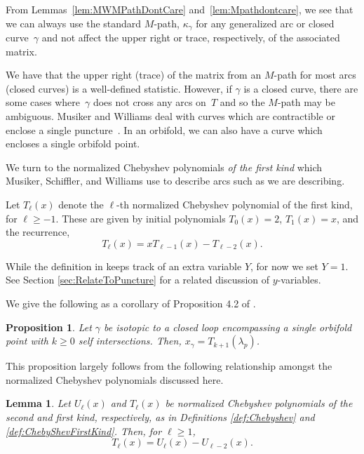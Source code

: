 \documentclass[11pt]{article}
\numberwithin{equation}{section}
\newtheorem{Lemma}[Theorem]{Lemma}
\newtheorem{Proposition}[Theorem]{Proposition}
\begin{document}
From Lemmas~\ref{lem:MWMPathDontCare} and~\ref{lem:Mpathdontcare}, we see that we can always use the standard $M$-path, $\kappa_\gamma$ for any generalized arc or closed curve~$\gamma$ and not affect the upper right or trace, respectively, of the associated matrix.

We have that the upper right (trace) of the matrix from an $M$-path for most arcs (closed curves) is a well-defined statistic. However, if $\gamma$ is a closed curve, there are some cases where~$\gamma$ does not cross any arcs on~$T$ and so the $M$-path may be ambiguous. Musiker and Williams deal with curves which are contractible or enclose a single puncture~\cite{MW}. In an orbifold, we can also have a curve which encloses a single orbifold point.

 We turn to the normalized Chebyshev polynomials \emph{of the first kind} which Musiker, Schiffler, and Williams use to describe arcs such as we are describing.

\begin{Definition}\label{def:ChebyShevFirstKind}
Let $T_\ell(x)$ denote the $\ell$-th norma\-lized Chebyshev polynomial of the first kind, for $\ell \geq -1$. These are given by initial polynomials $T_{0}(x) = 2$, $T_1(x) = x$, and the recurrence,
\[
T_\ell(x) = xT_{\ell-1}(x) - T_{\ell-2}(x).
\]
\end{Definition}

While the definition in \cite{MSW-bases} keeps track of an extra variable $Y$, for now we set $Y = 1$. See Section \ref{sec:RelateToPuncture} for a related discussion of $y$-variables.

We give the following as a corollary of Proposition 4.2 of \cite{MSW-bases}.

\begin{Proposition}\label{prop:MSWChebyshev}
Let $\gamma$ be isotopic to a closed loop encompassing a single orbifold point with $k\geq 0$ self intersections. Then, $x_\gamma = T_{k+1}(\lambda_p)$.
\end{Proposition}

This proposition largely follows from the following relationship amongst the normalized Chebyshev polynomials discussed here.

\begin{Lemma}\label{lem:RelatingChebyshev}
Let $U_\ell(x)$ and $T_\ell(x)$ be normalized Chebyshev polynomials of the second and first kind, respectively, as in Definitions {\rm \ref{def:Chebyshev}} and {\rm \ref{def:ChebyShevFirstKind}}. Then, for $\ell \geq 1$, \[
T_\ell(x) = U_\ell(x) - U_{\ell-2}(x).
\]
\end{Lemma}
\end{document}
